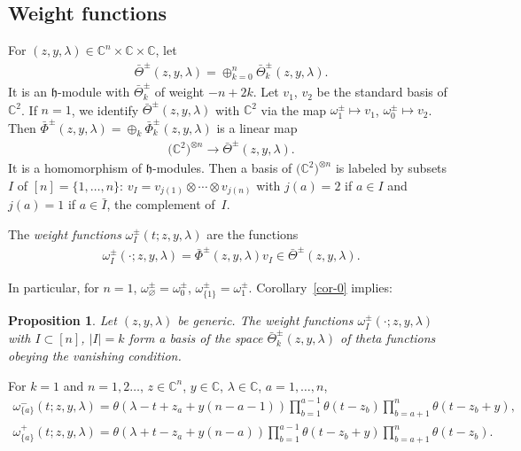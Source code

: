 \documentclass[pdftex]{sigma}
\numberwithin{equation}{section}
\newtheorem{Proposition}[Theorem]{Proposition}
 { \theoremstyle{definition}
\newtheorem{Definition}[Theorem]{Definition}
\newtheorem{Example}[Theorem]{Example}
\newtheorem{Remark}[Theorem]{Remark} }
\begin{document}
\subsection{Weight functions}\label{ss-3.5}
For $(z,y,\lambda)\in\mathbb C^n\times\mathbb C\times\mathbb C$, let
\begin{gather*}
\bar\Theta^\pm(z,y,\lambda)=\oplus_{k=0}^n \bar\Theta^\pm_k(z,y,\lambda).
\end{gather*}
It is an $\mathfrak h$-module with $\bar\Theta^\pm_{k}$ of weight $-n+2k$. Let $v_1$, $v_2$ be the standard basis of $\mathbb C^2$. If $n=1$, we identify $\bar \Theta^\pm(z,y,\lambda)$ with $\mathbb C^2$ via the map
$\omega^{\pm}_1\mapsto v_1$, $\omega^{\pm}_0\mapsto v_2$. Then $\bar\Phi^\pm(z,y,\lambda)=\oplus_k\bar\Phi^\pm_k(z,y,\lambda)$ is a linear map
\begin{gather*}
 \big(\mathbb C^2\big)^{\otimes n}\to \bar\Theta^\pm(z,y,\lambda).
\end{gather*}
It is a homomorphism of $\mathfrak h$-modules. Then a basis of $\big(\mathbb C^2\big)^{\otimes n}$ is labeled by subsets $I$ of $[n]=\{1,\dots,n\}$: $v_I=v_{j(1)}\otimes\cdots\otimes v_{j(n)}$ with $j(a)=2$ if $a\in I$ and $j(a)=1$ if $a\in\bar I$, the complement of~$I$.
\begin{Definition} The {\em weight functions} $\omega^\pm_I(t;z,y,\lambda)$ are the functions
 \begin{gather*}
 \omega^\pm_I(\cdot;z,y,\lambda)=\bar\Phi^{\pm}(z,y,\lambda)v_I\in \bar \Theta^\pm(z,y,\lambda).
 \end{gather*}
\end{Definition}
In particular, for $n=1$, $\omega^\pm_\varnothing=\omega^\pm_0$, $\omega^\pm_{\{1\}}=\omega_1^\pm$. Corollary~\ref{cor-0} implies:
\begin{Proposition}\label{p-basis} Let $(z,y,\lambda)$ be generic. The weight functions $\omega^\pm_I(\cdot; z,y,\lambda)$ with $I\subset [n]$, $|I|=k$ form a basis of the space $\bar\Theta^\pm_k(z,y,\lambda)$ of theta
functions obeying the vanishing condition.
\end{Proposition}
\begin{Example}\label{example-6} For $k=1$ and $n=1,2\dots$, $z\in\mathbb C^n$, $y\in\mathbb C$, $\lambda\in\mathbb C$, $a=1,\dots,n$,
 \begin{gather*}
 \omega^-_{\{a\}}(t;z,y,\lambda) =\theta(\lambda-t+z_a+y(n-a-1)) \prod_{b=1}^{a-1}\theta(t-z_b) \prod_{b=a+1}^n \theta(t-z_b+y),\\
 \omega^+_{\{a\}}(t;z,y,\lambda) =\theta(\lambda+t-z_a+y(n-a)) \prod_{b=1}^{a-1}\theta(t-z_b+y) \prod_{b=a+1}^n \theta(t-z_b).
 \end{gather*}
\end{Example}
\end{document}
